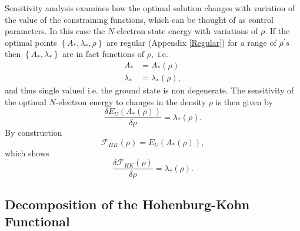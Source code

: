 \documentclass[aps,preprint]{revtex4}%
\begin{document}
Sensitivity analysis \cite{Hestenes75} examines how the optimal solution
changes with variation of the value of the constraining functions, which can
be thought of as control parameters. In this case the $N$-electron state
energy with variations of $\rho.$ If the optimal points $\left\{  A_{\ast
},\lambda_{\ast},\rho\right\}  $ are regular (Appendix \ref{Regular}) for a
range of $\rho^{\prime}s$ then $\left\{  A_{\ast},\lambda_{\ast}\right\}  $
are in fact functions of $\rho,$ i.e.
\begin{align}
A_{\ast}  &  =A_{\ast}\left(  \rho\right) \nonumber\\
\lambda_{\ast}  &  =\lambda_{\ast}\left(  \rho\right)  ,
\end{align}
and thus single valued i.e. the ground state is non degenerate. The
sensitivity of the optimal $N$-electron energy to changes in the density
$\rho$ is then given by
\begin{equation}
\frac{\delta E_{U}\left(  A_{\ast}\left(  \rho\right)  \right)  }{\delta\rho
}=\lambda_{\ast}\left(  \rho\right)  .
\end{equation}
By construction
\begin{equation}
\mathcal{F}_{HK}\left(  \rho\right)  =E_{U}\left(  A_{\ast}\left(
\rho\right)  \right)  ,
\end{equation}
which shows
\begin{equation}
\frac{\delta\mathcal{F}_{HK}\left(  \rho\right)  }{\delta\rho}=\lambda_{\ast
}\left(  \rho\right)  .
\end{equation}


\subsection{Decomposition of the Hohenburg-Kohn Functional\label{DecompHK}}
\end{document}
